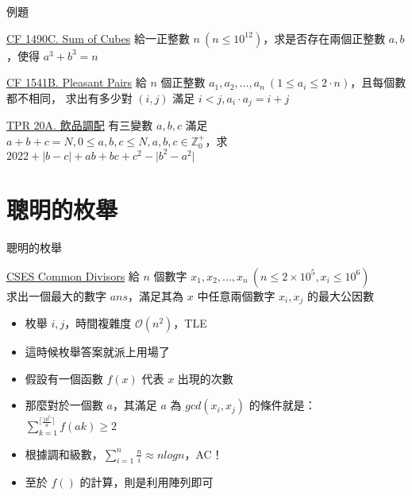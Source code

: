 \documentclass[aspectratio=169]{beamer}
\begin{document}
    \begin{frame}{例題}
        \begin{block}{\href{https://codeforces.com/problemset/problem/1490/C}{CF 1490C. Sum of Cubes}}
            給一正整數 $n\ (n \le 10^{12})$，求是否存在兩個正整數 $a, b$，使得 $a^3 + b^3 = n$
        \end{block}

        \begin{block}{\href{https://codeforces.com/problemset/problem/1541/B}{CF 1541B. Pleasant Pairs}}
            給 $n$ 個正整數 $a_1, a_2, \dots, a_n\ (1 \le a_i \le 2 \cdot n)$，且每個數都不相同，
            求出有多少對 $(i, j)$ 滿足 $i < j, a_i \cdot a_j = i + j$
        \end{block}

        \begin{block}{\href{https://codeforces.com/group/H0qY3QmnOW/contest/377732/problem/A}{TPR 20A. 飲品調配}}
            有三變數 $a, b, c$ 滿足 $a + b + c = N, 0 \le a, b, c \le N, a, b, c \in \mathbb{Z}^+_0$，求 $2022 + \lvert b - c \rvert + ab + bc + c^2 - \lvert b^2 - a^2 \rvert$
        \end{block}
    \end{frame}

    \section{聰明的枚舉}

    \begin{frame}{聰明的枚舉}
        \begin{block}{\href{https://cses.fi/problemset/task/1081}{CSES Common Divisors}}
            給 $n$ 個數字 $x_1, x_2, ..., x_n\ (n \le 2 \times 10^5, x_i \le 10^6)$\\
            求出一個最大的數字 $ans$，滿足其為 $x$ 中任意兩個數字 $x_i, x_j$ 的最大公因數
        \end{block}

        \begin{itemize}
            \item<1-> 枚舉 $i, j$，時間複雜度 $\mathcal{O}(n^2)$，TLE
            \item<2-> 這時候枚舉答案就派上用場了
            \item<3-> 假設有一個函數 $f(x)$ 代表 $x$ 出現的次數
            \item<3-> 那麼對於一個數 $a$，其滿足 $a$ 為 $gcd(x_i, x_j)$ 的條件就是：
            $\displaystyle\sum_{k = 1}^{\lceil \frac{10^6}{a} \rceil}{f(ak)} \ge 2$
            \item<4-> 根據調和級數，$\displaystyle\sum_{i = 1}^{n}{\frac{n}{i}} \approx nlogn$，AC！
            \item<5-> 至於 $f()$ 的計算，則是利用陣列即可
        \end{itemize}
    \end{frame}
\end{document}
